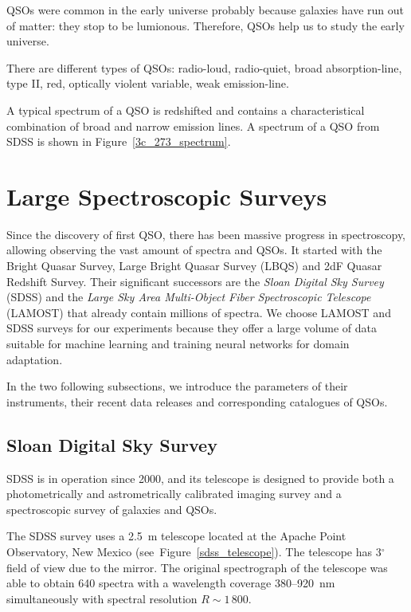 QSOs were common in the early universe probably because galaxies have run out of matter: they stop to be lumionous.
Therefore, QSOs help us to study the early universe.

There are different types of QSOs: radio-loud, radio-quiet, broad absorption-line, type II, red, optically violent variable, weak emission-line.

A typical spectrum of a QSO is redshifted and
contains a characteristical combination of broad and narrow emission lines.
A spectrum of a QSO from SDSS is shown in Figure~\ref{3c_273_spectrum}.

\section{Large Spectroscopic Surveys}
\label{large_spec_surveys}

Since the discovery of first QSO,
there has been massive progress in spectroscopy,
allowing observing the vast amount of spectra and QSOs.
It started with the Bright Quasar Survey, Large Bright Quasar Survey (LBQS) and 2dF Quasar Redshift Survey.
Their significant successors are the \textit{Sloan Digital Sky Survey} (SDSS)
and the \textit{Large Sky Area Multi-Object Fiber Spectroscopic Telescope} (LAMOST)
that already contain millions of spectra.
We choose LAMOST and SDSS surveys for our experiments
because they offer a large volume of data suitable for machine learning
and training neural networks for domain adaptation.

In the two following subsections,
we introduce the parameters of their instruments,
their recent data releases and corresponding catalogues of QSOs.

\subsection{Sloan Digital Sky Survey}
\label{sdss}

SDSS is in operation since 2000,
and its telescope is designed to provide both a photometrically
and astrometrically calibrated imaging survey
and a spectroscopic survey of galaxies and QSOs.~\cite{york2000}

The SDSS survey uses a 2.5~m telescope located at the Apache Point Observatory, New Mexico (see~Figure~\ref{sdss_telescope}).
The telescope has 3\(^{\circ}\) field of view due to the mirror.
The original spectrograph of the telescope was able to obtain 640 spectra
with a wavelength coverage 380--920~nm simultaneously
with spectral resolution \(R \sim 1\,800\).~\cite{gunn1998, york2000}

